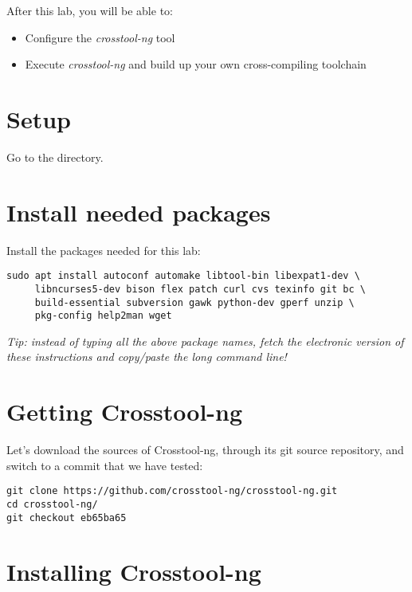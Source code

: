 
After this lab, you will be able to:

\begin{itemize}
\item Configure the {\em crosstool-ng} tool
\item Execute {\em crosstool-ng} and build up your own cross-compiling toolchain
\end{itemize}

\section{Setup}

Go to the  directory.

\section{Install needed packages}

Install the packages needed for this lab:

\begin{verbatim}
sudo apt install autoconf automake libtool-bin libexpat1-dev \
     libncurses5-dev bison flex patch curl cvs texinfo git bc \
     build-essential subversion gawk python-dev gperf unzip \
     pkg-config help2man wget
\end{verbatim}

{\em Tip: instead of typing all the above package names, fetch the
electronic version of these instructions and copy/paste the 
long command line!}

\section{Getting Crosstool-ng}

Let's download the sources of Crosstool-ng, through its git
source repository, and switch to a commit that we have tested: 

\begin{verbatim}
git clone https://github.com/crosstool-ng/crosstool-ng.git
cd crosstool-ng/
git checkout eb65ba65 
\end{verbatim}

\section{Installing Crosstool-ng}

